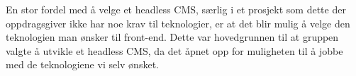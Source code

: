 En stor fordel med å velge et headless CMS, særlig i et prosjekt som dette der oppdragsgiver ikke har noe krav til teknologier, er at det blir mulig å velge den teknologien man ønsker til front-end. Dette var hovedgrunnen til at gruppen valgte å utvikle et headless CMS, da det åpnet opp for muligheten til å jobbe med de teknologiene vi selv ønsket.








